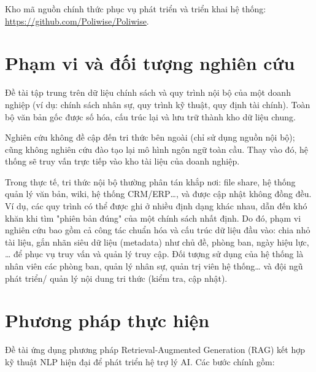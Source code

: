 \documentclass[12pt,a4paper]{report}
\begin{document}
Kho mã nguồn chính thức phục vụ phát triển và triển khai hệ thống: \url{https://github.com/Poliwise/Poliwise}.

\section{Phạm vi và đối tượng nghiên cứu}
Đề tài tập trung trên dữ liệu chính sách và quy trình nội bộ của một doanh nghiệp (ví dụ: chính sách nhân sự, quy trình kỹ thuật, quy định tài chính). Toàn bộ văn bản gốc được số hóa, cấu trúc lại và lưu trữ thành kho dữ liệu chung.

Nghiên cứu không đề cập đến tri thức bên ngoài (chỉ sử dụng nguồn nội bộ); cũng không nghiên cứu đào tạo lại mô hình ngôn ngữ toàn cầu. Thay vào đó, hệ thống sẽ truy vấn trực tiếp vào kho tài liệu của doanh nghiệp.

Trong thực tế, tri thức nội bộ thường phân tán khắp nơi: file share, hệ thống quản lý văn bản, wiki, hệ thống CRM/ERP…, và được cập nhật không đồng đều. Ví dụ, các quy trình có thể được ghi ở nhiều định dạng khác nhau, dẫn đến khó khăn khi tìm "phiên bản đúng" của một chính sách nhất định. Do đó, phạm vi nghiên cứu bao gồm cả công tác chuẩn hóa và cấu trúc dữ liệu đầu vào: chia nhỏ tài liệu, gắn nhãn siêu dữ liệu (metadata) như chủ đề, phòng ban, ngày hiệu lực, … để phục vụ truy vấn và quản lý truy cập. Đối tượng sử dụng của hệ thống là nhân viên các phòng ban, quản lý nhân sự, quản trị viên hệ thống… và đội ngũ phát triển/ quản lý nội dung tri thức (kiểm tra, cập nhật).

\section{Phương pháp thực hiện}
Đề tài ứng dụng phương pháp Retrieval-Augmented Generation (RAG) kết hợp kỹ thuật NLP hiện đại để phát triển hệ trợ lý AI. Các bước chính gồm:
\end{document}
